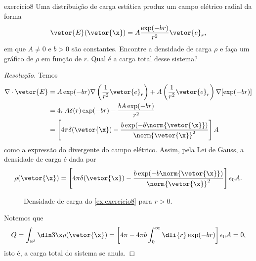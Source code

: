 \begin{exercício}{}{exercício8}
    Uma distribuição de carga estática produz um campo elétrico radial da forma
    \begin{equation*}
        \vetor{E}(\vetor{\x}) = A\frac{\exp(-br)}{r^2}\vetor{e}_r,
    \end{equation*}
    em que \(A \neq 0\) e \(b > 0\) são constantes. Encontre a densidade de carga \(\rho\) e faça um gráfico de \(\rho\) em função de \(r\). Qual é a carga total desse sistema?
\end{exercício}
\begin{proof}[Resolução]
    Temos
    \begin{align*}
        \nabla \cdot \vetor{E} &= A \exp(-br)\nabla\left(\frac1{r^2}\vetor{e}_r\right) + A \left(\frac{1}{r^2}\vetor{e}_r\right)\nabla[\exp(-br)]\\
        &= 4\pi A \delta(r) \exp(-br) - \frac{bA\exp(-br)}{r^2}\\
        &= \left[4\pi \delta(\vetor{\x}) - \frac{b \exp(-b\norm{\vetor{\x}})}{\norm{\vetor{\x}}^2}\right]A
    \end{align*}
    como a expressão do divergente do campo elétrico. Assim, pela Lei de Gauss, a densidade de carga é dada por
    \begin{equation*}
        \rho(\vetor{\x}) = \left[4\pi \delta(\vetor{\x}) - \frac{b \exp(-b\norm{\vetor{\x}})}{\norm{\vetor{\x}}^2}\right]\epsilon_0 A.
    \end{equation*}

    \begin{figure}[!h]
        \centering
        \caption{Densidade de carga do \cref{ex:exercício8} para \(r > 0\).}
    \end{figure}

    Notemos que
    \begin{align*}
        Q = \int_{\mathbb{R}^3} \dln3\x \rho(\vetor{\x}) = \left[4\pi - 4\pi b \int_{0}^\infty \dli{r} \exp(-br)\right]\epsilon_0 A = 0,
    \end{align*}
    isto é, a carga total do sistema se anula.
\end{proof}
